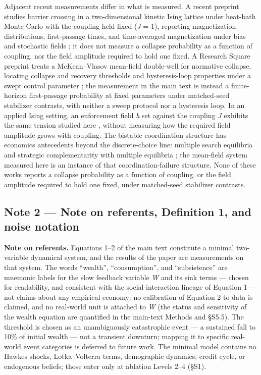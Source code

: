 \documentclass[11pt,letterpaper]{article}
\begin{document}
Adjacent recent measurements differ in what is measured. A recent preprint studies barrier crossing in a two-dimensional kinetic Ising lattice under heat-bath Monte Carlo with the coupling held fixed (\emph{J} = 1), reporting magnetization distributions, first-passage times, and time-averaged magnetization under bias and stochastic fields \cite{oliverbonafoux2026}; it does not measure a collapse probability as a function of coupling, nor the field amplitude required to hold one fixed. A Research Square preprint treats a McKean--Vlasov mean-field double-well for normative collapse, locating collapse and recovery thresholds and hysteresis-loop properties under a swept control parameter \cite{abreufilho2025}; the measurement in the main text is instead a finite-horizon first-passage probability at fixed parameters under matched-seed stabilizer contrasts, with neither a sweep protocol nor a hysteresis loop. In an applied Ising setting, an enforcement field \emph{h} set against the coupling \emph{J} exhibits the same tension studied here \cite{zaklan2009}, without measuring how the required field amplitude grows with coupling. The bistable coordination structure has economics antecedents beyond the discrete-choice line: multiple search equilibria \cite{diamond1982} and strategic complementarity with multiple equilibria \cite{cooperjohn1988}; the mean-field system measured here is an instance of that coordination-failure structure. None of these works reports a collapse probability as a function of coupling, or the field amplitude required to hold one fixed, under matched-seed stabilizer contrasts.

\subsection{Note 2 --- Note on referents, Definition 1, and noise notation}\label{note-2-note-on-referents-definition-1-and-noise-notation}

\textbf{Note on referents.} Equations 1--2 of the main text constitute a minimal two-variable dynamical system, and the results of the paper are measurements on that system. The words ``wealth'', ``consumption'', and ``subsistence'' are mnemonic labels for the slow feedback variable \emph{W} and its sink terms --- chosen for readability, and consistent with the social-interaction lineage of Equation 1 --- not claims about any empirical economy: no calibration of Equation 2 to data is claimed, and no real-world unit is attached to \emph{W} (the status and sensitivity of the wealth equation are quantified in the main-text Methods and §S5.5). The threshold is chosen as an unambiguously catastrophic event --- a sustained fall to 10\% of initial wealth --- not a transient downturn; mapping it to specific real-world event categories is deferred to future work. The minimal model contains no Hawkes shocks, Lotka--Volterra terms, demographic dynamics, credit cycle, or endogenous beliefs; those enter only at ablation Levels 2--4 (§S1).
\end{document}
